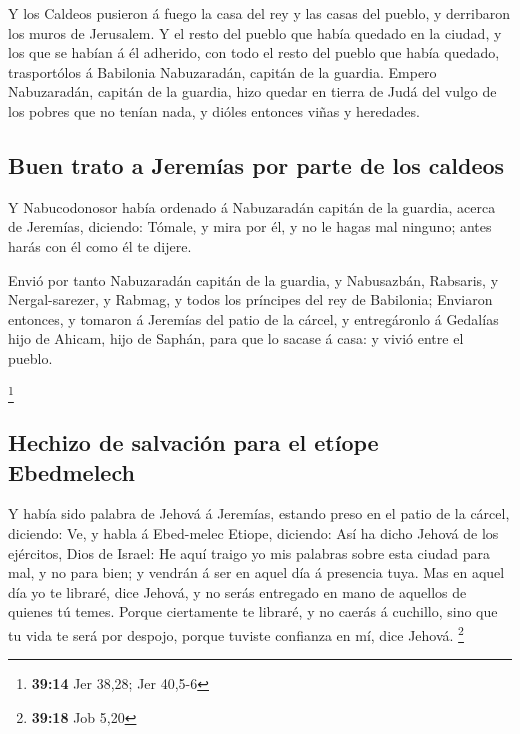  Y los Caldeos pusieron á fuego la casa del rey y las
casas del pueblo, y derribaron los muros de Jerusalem.  Y
el resto del pueblo que había quedado en la ciudad, y los que se habían
á él adherido, con todo el resto del pueblo que había quedado,
trasportólos á Babilonia Nabuzaradán, capitán de la guardia.
 Empero Nabuzaradán, capitán de la guardia, hizo quedar
en tierra de Judá del vulgo de los pobres que no tenían nada, y dióles
entonces viñas y heredades.

\hypertarget{buen-trato-a-jeremuxedas-por-parte-de-los-caldeos}{%
\subsection{Buen trato a Jeremías por parte de los
caldeos}\label{buen-trato-a-jeremuxedas-por-parte-de-los-caldeos}}

 Y Nabucodonosor había ordenado á Nabuzaradán capitán de
la guardia, acerca de Jeremías, diciendo:  Tómale, y mira
por él, y no le hagas mal ninguno; antes harás con él como él te dijere.

 Envió por tanto Nabuzaradán capitán de la guardia, y
Nabusazbán, Rabsaris, y Nergal-sarezer, y Rabmag, y todos los príncipes
del rey de Babilonia;  Enviaron entonces, y tomaron á
Jeremías del patio de la cárcel, y entregáronlo á Gedalías hijo de
Ahicam, hijo de Saphán, para que lo sacase á casa: y vivió entre el
pueblo.

\footnote{\textbf{39:14} Jer 38,28; Jer 40,5-6}

\hypertarget{hechizo-de-salvaciuxf3n-para-el-etuxedope-ebedmelech}{%
\subsection{Hechizo de salvación para el etíope
Ebedmelech}\label{hechizo-de-salvaciuxf3n-para-el-etuxedope-ebedmelech}}

 Y había sido palabra de Jehová á Jeremías, estando preso
en el patio de la cárcel, diciendo:  Ve, y habla á
Ebed-melec Etiope, diciendo: Así ha dicho Jehová de los ejércitos, Dios
de Israel: He aquí traigo yo mis palabras sobre esta ciudad para mal, y
no para bien; y vendrán á ser en aquel día á presencia tuya.
 Mas en aquel día yo te libraré, dice Jehová, y no serás
entregado en mano de aquellos de quienes tú temes. 
Porque ciertamente te libraré, y no caerás á cuchillo, sino que tu vida
te será por despojo, porque tuviste confianza en mí, dice Jehová.
\footnote{\textbf{39:18} Job 5,20}

